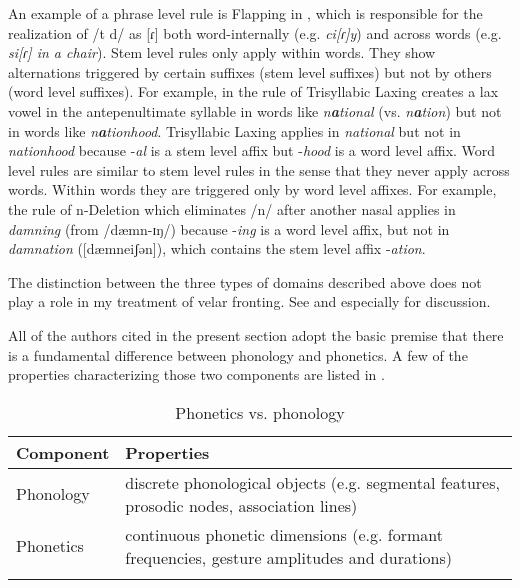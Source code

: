 An example of a phrase level rule is Flapping in , which is responsible for the realization of /t d/ as [ɾ] both word-internally (e.g. \textit{ci[ɾ]y}) and across words (e.g. \textit{si[ɾ] in a chair}). Stem level rules only apply within words. They show alternations triggered by certain suffixes (stem level suffixes) but not by others (word level suffixes). For example, in  the rule of Trisyllabic Laxing creates a lax vowel in the antepenultimate syllable in words like \textit{n}\textbf{\textit{a}}\textit{tional} (vs. \textit{n}\textbf{\textit{a}}\textit{tion}) but not in words like \textit{n}\textbf{\textit{a}}\textit{tionhood}. Trisyllabic Laxing applies in \textit{national} but not in \textit{nationhood} because -\textit{al} is a stem level affix but -\textit{hood} is a word level affix. Word level rules are similar to stem level rules in the sense that they never apply across words. Within words they are triggered only by word level affixes. For example, the  rule of n-Deletion which eliminates /n/ after another nasal applies in \textit{damning} (from /dæmn-ɪŋ/) because -\textit{ing} is a word level affix, but not in \textit{damnation} ([dæmneiʃǝn]), which contains the stem level affix -\textit{ation}.

The distinction between the three types of domains described above does not play a role in my treatment of velar fronting. See  and especially  for discussion.

All of the authors cited in the present section adopt the basic premise that there is a fundamental difference between phonology and phonetics. A few of the properties characterizing those two components \citep{Bermúdez-Otero2015} are listed in .

\begin{table}
\caption{Phonetics vs. phonology\label{tab:fromex:2:1}}
\begin{tabularx}{\textwidth}{lQ}
\lsptoprule
Component & Properties\\\midrule
Phonology & discrete phonological objects (e.g. segmental features, prosodic nodes, association lines)\\
Phonetics & continuous phonetic dimensions (e.g. formant frequencies, gesture amplitudes and durations)\\
\lspbottomrule
\end{tabularx}
\end{table}

